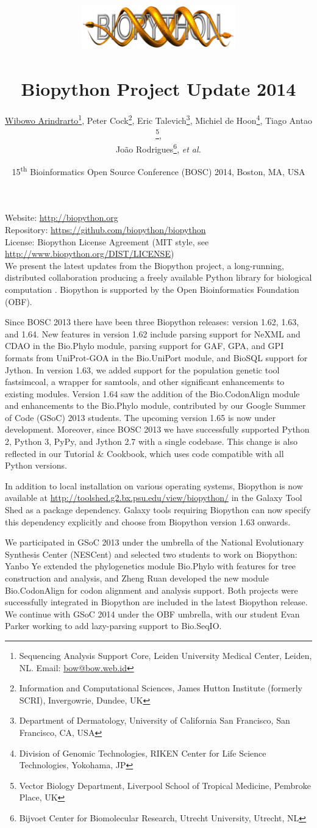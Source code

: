 \documentclass[10pt,oneside]{article}
\title{%
\vspace{-1.5in}
\includegraphics[width=0.5\textwidth]{biopython.jpg}\\
~\\Biopython Project Update 2014}
\author{
    \underline{Wibowo Arindrarto}\footnote{Sequencing Analysis Support Core, Leiden University Medical Center, Leiden, NL. Email: \href{mailto:bow@bow.web.id}{bow@bow.web.id}},
    Peter Cock\footnote{Information and Computational Sciences, James Hutton Institute (formerly SCRI), Invergowrie, Dundee, UK},
    Eric Talevich\footnote{Department of Dermatology, University of California San Francisco, San Francisco, CA, USA},
    Michiel de Hoon\footnote{Division of Genomic Technologies, RIKEN Center for Life Science Technologies, Yokohama, JP},
    Tiago Antao \footnote{Vector Biology Department, Liverpool School of Tropical Medicine, Pembroke Place, UK},
    \\
    Jo\~{a}o Rodrigues\footnote{Bijvoet Center for Biomolecular Research, Utrecht University, Utrecht, NL},
    \textit{et al.}}
\date{15\textsuperscript{th} Bioinformatics Open Source Conference (BOSC) 2014, Boston, MA, USA}
\begin{document}
\maketitle
\thispagestyle{empty}

\vspace{-0.2in}
\noindent
Website: \url{http://biopython.org} \\
Repository: \url{https://github.com/biopython/biopython} \\
License: Biopython License Agreement (MIT style, see \url{http://www.biopython.org/DIST/LICENSE}) \\

We present the latest updates from the Biopython project, a long-running,
distributed collaboration producing a freely available Python library for
biological computation \citep{AppNote}. Biopython is supported by the Open
Bioinformatics Foundation (OBF).

Since BOSC 2013 there have been three Biopython releases: version 1.62, 1.63,
and 1.64. New features in version 1.62 include parsing support for NeXML and
CDAO in the Bio.Phylo module, parsing support for GAF, GPA, and GPI formats
from UniProt-GOA in the Bio.UniPort module, and BioSQL support for Jython.
In version 1.63, we added  support for the population genetic tool
fastsimcoal, a wrapper for samtools, and other significant enhancements to
existing modules. Version 1.64 saw the addition of the Bio.CodonAlign module
and enhancements to the Bio.Phylo module, contributed by our Google Summer
of Code (GSoC) 2013 students. The upcoming version 1.65 is now under development.
Moreover, since BOSC 2013 we have successfully supported Python 2, Python 3,
PyPy, and Jython 2.7 with a single codebase. This change is also reflected in
our Tutorial \& Cookbook, which uses code compatible with all Python versions.

In addition to local installation on various operating systems, Biopython
is now available at \url{http://toolshed.g2.bx.psu.edu/view/biopython/}
in the Galaxy Tool Shed \citep{ToolShed} as a package dependency. Galaxy tools
requiring Biopython can now specify this dependency explicitly and choose from
Biopython version 1.63 onwards.

We participated in GSoC 2013 under the umbrella of the National Evolutionary
Synthesis Center (NESCent) and selected two students to work on Biopython:
Yanbo Ye extended the phylogenetics module Bio.Phylo with features for tree
construction and analysis, and Zheng Ruan developed the new module
Bio.CodonAlign for codon alignment and analysis support. Both projects were
successfully integrated in Biopython are included in the latest Biopython
release. We continue with GSoC 2014 under the OBF umbrella, with our student
Evan Parker working to add lazy-parsing support to Bio.SeqIO.
\end{document}
